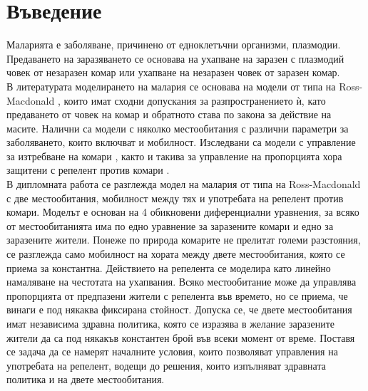 \section{Въведение}
Маларията е заболяване, причинено от едноклетъчни организми, плазмодии.
Предаването на заразяването се основава на ухапване на заразен с плазмодий човек от незаразен комар или ухапване на незаразен човек от заразен комар. \\
В литературата моделирането на малария се основава на модели от типа на Ross-Macdonald \cite{Smith2012}, които имат сходни допускания за разпространението ѝ, като предаването от човек на комар и обратното става по закона за действие на масите.
Налични са модели \cite{Cosner2009, Ruktanonchai2016, Bichara2016} с няколко местообитания с различни параметри за заболяването, които включват и мобилност.
Изследвани са модели с управление за изтребване на комари \cite{DeLara2016}, както и такива за управление на пропорцията хора защитени с репелент против комари \cite{Rashkov2022, Rashkov2021}. \\
В дипломната работа се разглежда модел на малария от типа на Ross-Macdonald с две местообитания, мобилност между тях и употребата на репелент против комари.
Моделът е основан на 4 обикновени диференциални уравнения, за всяко от местообитанията има по едно уравнение за заразените комари и едно за заразените жители.
Понеже по природа комарите не прелитат големи разстояния, се разглежда само мобилност на хората между двете местообитания, която се приема за константна.
Действието на репелента се моделира като линейно намаляване на честотата на ухапвания.
Всяко местообитание може да управлява пропорцията от предпазени жители с репелента във времето, но се приема, че винаги е под някаква фиксирана стойност.
Допуска се, че двете местообитания имат независима здравна политика, която се изразява в желание заразените жители да са под някакъв константен брой във всеки момент от време.
Поставя се задача да се намерят началните условия, които позволяват управления на употребата на репелент, водещи до решения, които изпълняват здравната политика и на двете местообитания.
